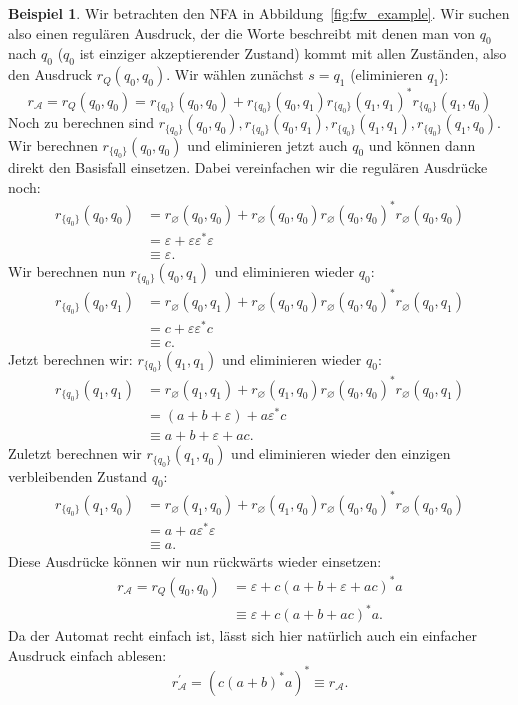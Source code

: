 \documentclass[11pt, a4paper]{article}
\theoremstyle{definition}
\newtheorem{example}[definition]{Beispiel}
\theoremstyle{plain}
\numberwithin{equation}{section}
\let\emptyset\varnothing
\begin{document}
\begin{example}\label{exp:fw_example}
	Wir betrachten den NFA in Abbildung~\ref{fig:fw_example}. Wir suchen also einen regulären Ausdruck, der die Worte beschreibt mit denen man von \( q_0 \) nach \( q_0 \) (\( q_0 \) ist einziger akzeptierender Zustand) kommt mit allen Zuständen, also den Ausdruck \( r_Q(q_0, q_0) \). Wir wählen zunächst \( s = q_1 \) (eliminieren \( q_1 \)):
	\[
		r_\mathcal{A} = r_Q(q_0, q_0) = r_{\{ q_0 \}}(q_0, q_0) + r_{\{ q_0 \}}(q_0, q_1) r_{\{ q_0 \}}(q_1, q_1)^\ast r_{\{ q_0 \}}(q_1, q_0)
	\]
	Noch zu berechnen sind \( r_{\{ q_0 \}}(q_0, q_0), r_{\{ q_0 \}}(q_0, q_1), r_{\{ q_0 \}}(q_1, q_1), r_{\{ q_0 \}}(q_1, q_0) \). Wir berechnen \( r_{\{ q_0 \}}(q_0, q_0) \) und eliminieren jetzt auch \( q_0 \) und können dann direkt den Basisfall einsetzen. Dabei vereinfachen wir die regulären Ausdrücke noch:
	\begin{align*}
		r_{\{ q_0 \}}(q_0, q_0) &= r_\emptyset(q_0, q_0) + r_\emptyset(q_0, q_0) r_\emptyset(q_0, q_0)^\ast r_\emptyset(q_0, q_0)\\
		&= \varepsilon + \varepsilon \varepsilon^\ast \varepsilon\\
		&\equiv \varepsilon.
	\end{align*}
	Wir berechnen nun \( r_{\{ q_0 \}}(q_0, q_1) \) und eliminieren wieder \( q_0 \):
	\begin{align*}
		r_{\{ q_0 \}}(q_0, q_1) &= r_\emptyset(q_0, q_1) + r_\emptyset(q_0, q_0) r_\emptyset(q_0, q_0)^\ast r_\emptyset(q_0, q_1)\\
		&= c + \varepsilon \varepsilon^\ast c\\
		&\equiv c.
	\end{align*}
	Jetzt berechnen wir: \( r_{\{ q_0 \}}(q_1, q_1) \) und eliminieren wieder \( q_0 \):
	\begin{align*}
		r_{\{ q_0 \}}(q_1, q_1) &= r_\emptyset(q_1, q_1) + r_\emptyset(q_1, q_0) r_\emptyset(q_0, q_0)^\ast r_\emptyset(q_0, q_1)\\
		&= (a + b + \varepsilon) + a \varepsilon^\ast c\\
		&\equiv a + b + \varepsilon + ac.
	\end{align*}
	Zuletzt berechnen wir \( r_{\{ q_0 \}}(q_1, q_0) \) und eliminieren wieder den einzigen verbleibenden Zustand \( q_0 \):
	\begin{align*}
		r_{\{ q_0 \}}(q_1, q_0) &= r_\emptyset(q_1, q_0) + r_\emptyset(q_1, q_0) r_\emptyset(q_0, q_0)^\ast r_\emptyset(q_0, q_0)\\
		&= a + a \varepsilon^\ast \varepsilon\\
		&\equiv a.
	\end{align*}
	Diese Ausdrücke können wir nun rückwärts wieder einsetzen:
	\begin{align*}
		r_\mathcal{A} = r_Q(q_0, q_0) &= \varepsilon + c (a + b + \varepsilon + ac)^\ast  a\\
		&\equiv \varepsilon + c(a+b+ac)^\ast a.
	\end{align*}
	Da der Automat recht einfach ist, lässt sich hier natürlich auch ein einfacher Ausdruck einfach ablesen:
	\[
		r_\mathcal{A}^\prime = (c (a+b)^\ast a)^\ast \equiv r_\mathcal{A}.
	\]
\end{example}
\end{document}
